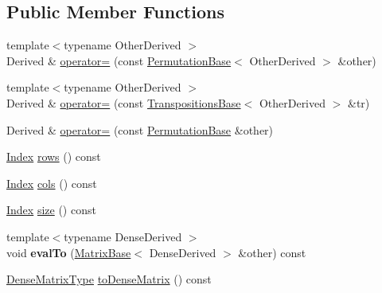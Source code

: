 \subsection*{Public Member Functions}
\begin{DoxyCompactItemize}
\item 
{\footnotesize template$<$typename Other\+Derived $>$ }\\Derived \& \mbox{\hyperlink{class_eigen_1_1_permutation_base_a8e15540549c5a4e2d5b3b426fef8fbcf}{operator=}} (const \mbox{\hyperlink{class_eigen_1_1_permutation_base}{Permutation\+Base}}$<$ Other\+Derived $>$ \&other)
\item 
{\footnotesize template$<$typename Other\+Derived $>$ }\\Derived \& \mbox{\hyperlink{class_eigen_1_1_permutation_base_acaa7cce9ea62c811cec12e86dbb2f0de}{operator=}} (const \mbox{\hyperlink{class_eigen_1_1_transpositions_base}{Transpositions\+Base}}$<$ Other\+Derived $>$ \&tr)
\item 
Derived \& \mbox{\hyperlink{class_eigen_1_1_permutation_base_ac0e84abc954c5427469bb5e7a4717b46}{operator=}} (const \mbox{\hyperlink{class_eigen_1_1_permutation_base}{Permutation\+Base}} \&other)
\item 
\mbox{\hyperlink{struct_eigen_1_1_eigen_base_a554f30542cc2316add4b1ea0a492ff02}{Index}} \mbox{\hyperlink{class_eigen_1_1_permutation_base_acd7ed28ee514287f933de8467768925b}{rows}} () const
\item 
\mbox{\hyperlink{struct_eigen_1_1_eigen_base_a554f30542cc2316add4b1ea0a492ff02}{Index}} \mbox{\hyperlink{class_eigen_1_1_permutation_base_a26961ef6cfef586d412054ee5a20d430}{cols}} () const
\item 
\mbox{\hyperlink{struct_eigen_1_1_eigen_base_a554f30542cc2316add4b1ea0a492ff02}{Index}} \mbox{\hyperlink{class_eigen_1_1_permutation_base_a2216f9ce7b453ac39c46ff0323daeac9}{size}} () const
\item 
\mbox{\label{class_eigen_1_1_permutation_base_a7b2258f68738a649330dbf629d67b0f4}} 
{\footnotesize template$<$typename Dense\+Derived $>$ }\\void {\bfseries eval\+To} (\mbox{\hyperlink{class_eigen_1_1_matrix_base}{Matrix\+Base}}$<$ Dense\+Derived $>$ \&other) const
\item 
\mbox{\hyperlink{class_eigen_1_1_matrix}{Dense\+Matrix\+Type}} \mbox{\hyperlink{class_eigen_1_1_permutation_base_addfa91a2c2c69c76159f1091368a505f}{to\+Dense\+Matrix}} () const
\item 

\end{DoxyCompactItemize}
